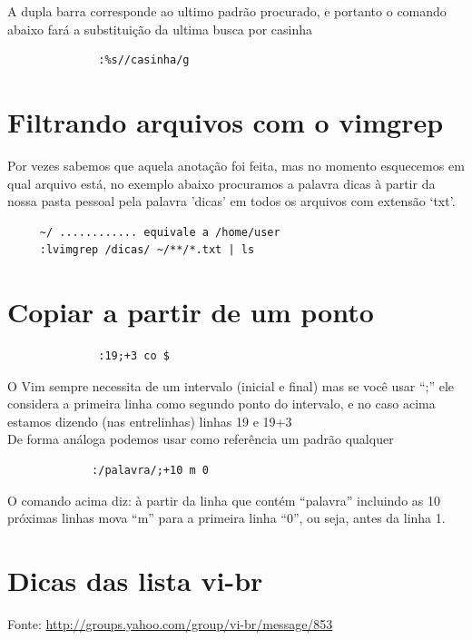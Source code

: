 \documentclass[10pt,a4paper,openany]{book}
\begin{document}
A dupla barra corresponde ao ultimo padrão procurado, e portanto o
comando abaixo fará a substituição da ultima busca por casinha

\begin{verbatim}
			  :%s//casinha/g
\end{verbatim}

\section{Filtrando arquivos com o vimgrep}
\label{Filtrando arquivos com o vimgrep}

Por vezes sabemos que aquela anotação foi feita, mas no momento esquecemos em qual
arquivo está, no exemplo abaixo procuramos a palavra dicas à partir da nossa pasta pessoal
pela palavra 'dicas' em todos os arquivos com extensão `txt'.

\begin{verbatim}
	 ~/ ............ equivale a /home/user
	 :lvimgrep /dicas/ ~/**/*.txt | ls
\end{verbatim}


\section{Copiar a partir de um ponto}

\begin{verbatim}
			  :19;+3 co $
\end{verbatim}

O Vim sempre necessita de um intervalo (inicial e final) mas se você
usar ``;'' ele considera a primeira linha como segundo ponto do
intervalo, e no caso acima estamos dizendo (nas entrelinhas) linhas
19 e 19+3     \\


De forma análoga podemos usar como referência um padrão qualquer

\begin{verbatim}
			 :/palavra/;+10 m 0
\end{verbatim}

O comando acima diz: à partir da linha que contém ``palavra'' incluindo as 10 próximas linhas
mova ``m'' para a primeira linha ``0'', ou seja, antes da linha 1.

\section{Dicas das lista vi-br}

 Fonte: \url{http://groups.yahoo.com/group/vi-br/message/853}
\end{document}
